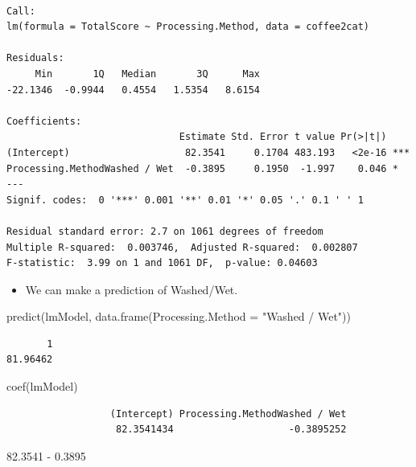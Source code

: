 \documentclass[
  letterpaper,
  DIV=11,
  numbers=noendperiod]{scrreprt}
\newenvironment{Shaded}{\begin{snugshade}}{\end{snugshade}}
\newcommand{\AttributeTok}[1]{\textcolor[rgb]{0.40,0.45,0.13}{#1}}
\newcommand{\FloatTok}[1]{\textcolor[rgb]{0.68,0.00,0.00}{#1}}
\newcommand{\FunctionTok}[1]{\textcolor[rgb]{0.28,0.35,0.67}{#1}}
\newcommand{\NormalTok}[1]{\textcolor[rgb]{0.00,0.23,0.31}{#1}}
\newcommand{\SpecialCharTok}[1]{\textcolor[rgb]{0.37,0.37,0.37}{#1}}
\newcommand{\StringTok}[1]{\textcolor[rgb]{0.13,0.47,0.30}{#1}}
\providecommand{\tightlist}{%
  \setlength{\itemsep}{0pt}\setlength{\parskip}{0pt}}\usepackage{longtable,booktabs,array}
\begin{document}
\begin{verbatim}

Call:
lm(formula = TotalScore ~ Processing.Method, data = coffee2cat)

Residuals:
     Min       1Q   Median       3Q      Max 
-22.1346  -0.9944   0.4554   1.5354   8.6154 

Coefficients:
                              Estimate Std. Error t value Pr(>|t|)    
(Intercept)                    82.3541     0.1704 483.193   <2e-16 ***
Processing.MethodWashed / Wet  -0.3895     0.1950  -1.997    0.046 *  
---
Signif. codes:  0 '***' 0.001 '**' 0.01 '*' 0.05 '.' 0.1 ' ' 1

Residual standard error: 2.7 on 1061 degrees of freedom
Multiple R-squared:  0.003746,  Adjusted R-squared:  0.002807 
F-statistic:  3.99 on 1 and 1061 DF,  p-value: 0.04603
\end{verbatim}

\begin{itemize}
\tightlist
\item
  We can make a prediction of Washed/Wet.
\end{itemize}

\begin{Shaded}
\begin{Highlighting}[]
\FunctionTok{predict}\NormalTok{(lmModel, }\FunctionTok{data.frame}\NormalTok{(}\AttributeTok{Processing.Method =} \StringTok{"Washed / Wet"}\NormalTok{))}
\end{Highlighting}
\end{Shaded}

\begin{verbatim}
       1 
81.96462 
\end{verbatim}

\begin{Shaded}
\begin{Highlighting}[]
\FunctionTok{coef}\NormalTok{(lmModel)}
\end{Highlighting}
\end{Shaded}

\begin{verbatim}
                  (Intercept) Processing.MethodWashed / Wet 
                   82.3541434                    -0.3895252 
\end{verbatim}

\begin{Shaded}
\begin{Highlighting}[]
\FloatTok{82.3541} \SpecialCharTok{{-}} \FloatTok{0.3895}
\end{Highlighting}
\end{Shaded}
\end{document}
